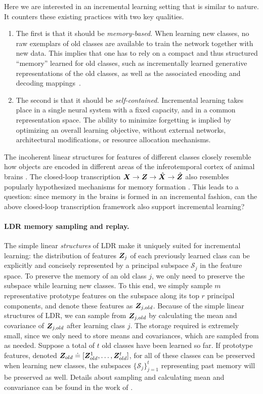 \documentclass[../../book-main.tex]{subfiles}
\begin{document}
Here we are interested in an incremental learning setting that is similar to nature. It  counters these existing practices with two key qualities. 
\begin{enumerate}
    \item The first is that it should be \emph{memory-based.} When learning new classes, no raw exemplars of old classes are available to train the network together with new data. This implies that one has to rely on a compact and thus structured ``memory'' learned for old classes, such as incrementally learned generative representations of the old classes, as well as the associated encoding and decoding mappings~\cite{fearnet}. 
    \item The second is that it should be \emph{self-contained.} Incremental learning takes place in a single neural system with a fixed capacity, and in a common representation space. The ability to minimize forgetting is implied by optimizing an overall learning objective, without external networks, architectural modifications, or resource allocation mechanisms.
\end{enumerate}

The incoherent linear structures for features of different classes closely resemble how objects are encoded in different areas of the inferotemporal cortex of animal brains \cite{Chang-Cell-2017,Bao2020AMO}. The closed-loop transcription $\bm{X} \rightarrow \bm{Z} \rightarrow \hat{\bm{X}} \rightarrow \hat{\bm{Z}}$ also resembles popularly hypothesized mechanisms for memory formation \cite{2020Vandeven,Josselyn2020MemoryER}. This leads to a question: since memory in the brains is formed in an incremental fashion, can the above closed-loop transcription framework also support incremental learning?

\paragraph{LDR memory sampling and replay.} The simple linear {\em structures} of LDR make it uniquely suited for incremental learning: the distribution of features $\bm{Z}_j$ of each previously learned class can be explicitly and concisely represented by a principal subspace $\mathcal{S}_j$ in the feature space. To preserve the memory of an old class $j$, we only need to preserve the subspace while learning new classes. To this end, we simply sample $m$ representative prototype features on the subspace along its top $r$ principal components, and denote these features as $\bm{Z}_{j,old}$. Because of the simple linear structures of LDR, we can sample from $\bm{Z}_{j,old}$ by calculating the mean and covariance of $\bm{Z}_{j,old}$ after learning class $j$. The storage required is extremely small, since we only need to store means and covariances, which are sampled from as needed. Suppose a total of $t$ old classes have been learned so far. If prototype features, denoted $\bm{Z}_{old} \doteq [\bm{Z}^1_{old},\ldots, \bm{Z}^t_{old}]$, for all of these classes can be preserved when learning new classes, the subspaces $\{\mathcal{S}_j\}_{j=1}^t$ representing past memory will be preserved as well. Details about sampling and calculating mean and convariance can be found in the work of \cite{tong2023incremental}.
\end{document}
